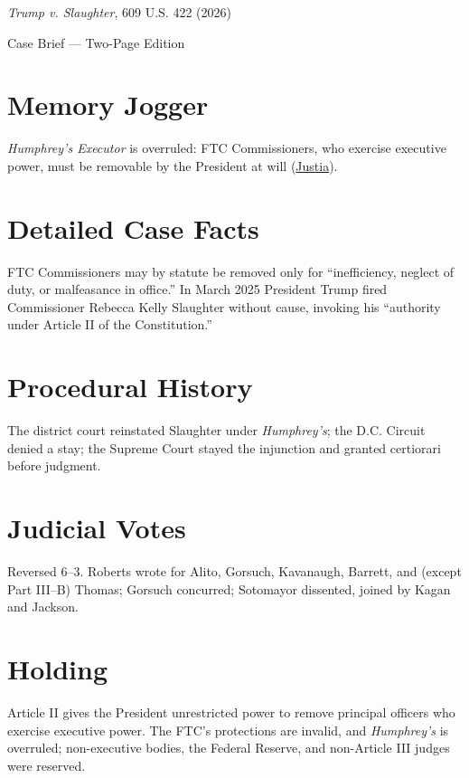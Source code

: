 \documentclass[12pt]{article}
\begin{document}
\begin{center}
{\LARGE \textit{Trump v. Slaughter}, 609 U.S. 422 (2026)\par}
\vspace{0.5em}
{\large Case Brief --- Two-Page Edition\par}
\end{center}

\section{Memory Jogger}
\textit{Humphrey's Executor} is overruled: FTC Commissioners, who exercise executive power, must be removable by the President at will (\href{https://supreme.justia.com/cases/federal/us/609/25-332/}{Justia}).

\section{Detailed Case Facts}
FTC Commissioners may by statute be removed only for ``inefficiency, neglect of duty, or malfeasance in office.'' In March 2025 President Trump fired Commissioner Rebecca Kelly Slaughter without cause, invoking his ``authority under Article II of the Constitution.''

\section{Procedural History}
The district court reinstated Slaughter under \textit{Humphrey's}; the D.C. Circuit denied a stay; the Supreme Court stayed the injunction and granted certiorari before judgment.

\section{Judicial Votes}
Reversed 6--3. Roberts wrote for Alito, Gorsuch, Kavanaugh, Barrett, and (except Part III--B) Thomas; Gorsuch concurred; Sotomayor dissented, joined by Kagan and Jackson.

\section{Holding}
Article II gives the President unrestricted power to remove principal officers who exercise executive power. The FTC's protections are invalid, and \textit{Humphrey's} is overruled; non-executive bodies, the Federal Reserve, and non-Article III judges were reserved.
\end{document}

